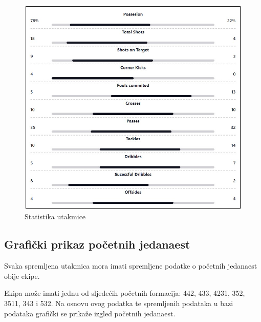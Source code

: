 \documentclass[times, utf8, zavrsni]{fer}
\begin{document}
\begin{figure}[htb]
\centering
\includegraphics[width=14.2cm]{images/statistic.jpg}
\caption{Statistika utakmice}
\label{fig:statistic}
\end{figure}

\subsection{Grafički prikaz početnih jedanaest}

Svaka spremljena utakmica mora imati spremljene podatke o početnih jedanaest obije ekipe.

Ekipa može imati jednu od sljedećih početnih formacija: 442, 433, 4231, 352, 3511, 343 i 532.
Na osnovu ovog podatka te spremljenih podataka u bazi podataka grafički se prikaže izgled početnih jedanaest.
\end{document}
